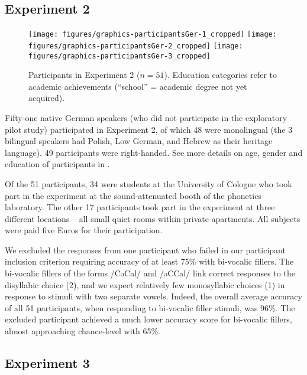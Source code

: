 \subsection{Experiment 2}\label{experiment-2}



\begin{figure}
\texttt{[image: figures/graphics-participantsGer-1\_cropped]} \texttt{[image: figures/graphics-participantsGer-2\_cropped]} \texttt{[image: figures/graphics-participantsGer-3\_cropped]} \caption{Participants in Experiment 2 ($n = 51$). Education categories refer to academic achievements (\enquote{school} = academic degree not yet acquired).}\label{fig:participantsGer}
\end{figure}

Fifty-one native German speakers (who did not participate in the exploratory pilot study) participated in Experiment 2, of which 48 were monolingual (the 3 bilingual speakers had Polish, Low German, and Hebrew as their heritage language). 49 participants were right-handed. See more details on age, gender and education of participants in .

Of the 51 participants, 34 were students at the University of Cologne who took part in the experiment at the sound-attenuated booth of the phonetics laboratory. The other 17 participants took part in the experiment at three different locations -- all small quiet rooms within private apartments. All subjects were paid five Euros for their participation.

We excluded the responses from one participant who failed in our participant inclusion criterion requiring accuracy of at least 75\% with bi-vocalic fillers. The bi-vocalic fillers of the forms /CəCal/ and /əCCal/ link correct responses to the disyllabic choice (2), and we expect relatively few monosyllabic choices (1) in response to stimuli with two separate vowels.
Indeed, the overall average accuracy of all 51 participants, when responding to bi-vocalic filler stimuli, was 96\%. The excluded participant achieved a much lower accuracy score for bi-vocalic fillers, almost approaching chance-level with 65\%.

\subsection{Experiment 3}\label{sec:participants3}




